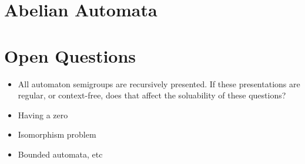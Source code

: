 \documentclass[10pt]{article}
\begin{document}
\section{Abelian Automata}

\section{Open Questions}

\begin{itemize}
\item All automaton semigroups are recursively presented. If these
  presentations are regular, or context-free, does that affect the
  soluability of these questions?
\item Having a zero
\item Isomorphism problem
\item Bounded automata, etc
\end{itemize}

\nocite{*}

\end{document}
